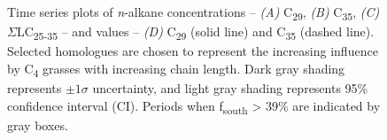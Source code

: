 \begin{figure}[p]
	\caption[\textit{n}-alkane concentration and  time-series plots]{Time series plots of \textit{n}-alkane concentrations -- \textit{(A)} C\textsubscript{29}, \textit{(B)} C\textsubscript{35}, \textit{(C)} $\Sigma$LC\textsubscript{25-35} -- and  values -- \textit{(D)} C\textsubscript{29} (solid line) and C\textsubscript{35} (dashed line). Selected homologues are chosen to represent the increasing influence by C\textsubscript{4} grasses with increasing chain length. Dark gray shading represents $\pm 1\sigma$ uncertainty, and light gray shading represents 95\% confidence interval (CI). Periods when f\textsubscript{south} > 39\% are indicated by gray boxes.}
	\label{Ch4Fig:4} 
\end{figure}

